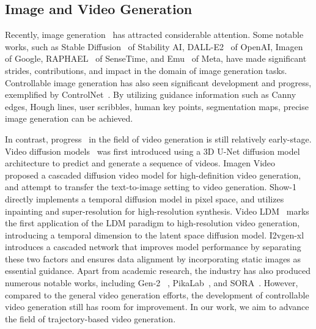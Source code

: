 \documentclass[runningheads]{llncs}
\begin{document}
\subsection{Image and Video Generation}
Recently, image generation~\cite{rombach2022high,ramesh2022hierarchical,wu2023paragraph,gu2024mix,wu2023diffumask,he2024ptqd,he2023efficientdm} has attracted considerable attention.
%
Some notable works, such as Stable Diffusion~\cite{rombach2022high} of Stability AI, DALL-E2~\cite{ramesh2022hierarchical} of OpenAI, Imagen~\cite{saharia2022photorealistic} of Google, RAPHAEL~\cite{xue2023raphael} of SenseTime, and Emu~\cite{dai2023emu} of Meta, have made significant strides, contributions, and impact in the domain of image generation tasks.
%
Controllable image generation has also seen significant development and progress, exemplified by ControlNet~\cite{zhang2023adding}.
%
By utilizing guidance information such as Canny edges, Hough lines, user scribbles, human key points, segmentation maps, precise image generation can be achieved.


In contrast, progress~\cite{xing2023survey,wu2023tune,wang2023lavie,chen2023videocrafter1,zhou2022magicvideo,zhang2023show} in the field of video generation is still relatively early-stage.
%
Video diffusion models~\cite{ho2022video} was first introduced using a 3D U-Net diffusion model architecture to predict and generate a sequence of videos.
%
Imagen Video~\cite{ho2022imagen} proposed a cascaded diffusion video model for high-definition video generation, and attempt to transfer the text-to-image setting to video generation.
%
Show-1~\cite{zhang2023show} directly implements a temporal diffusion model in pixel space, and utilizes inpainting and super-resolution for high-resolution synthesis.
%
Video LDM~\cite{blattmann2023align} marks the first application of the LDM paradigm to high-resolution video generation, introducing a temporal dimension to the latent space diffusion model.
%
I2vgen-xl~\cite{zhang2023i2vgen} introduces a cascaded network that improves model performance by separating these two factors and ensures data alignment by incorporating static images as essential guidance.
%
Apart from academic research, the industry has also produced numerous notable works, including Gen-2 ~\cite{esser2023structure}, PikaLab~\cite{pikalab}, and SORA~\cite{SORA}.
%
However, compared to the general video generation efforts, the development of controllable video generation still has room for improvement.
%
In our work, we aim to advance the field of trajectory-based video generation.
\end{document}
